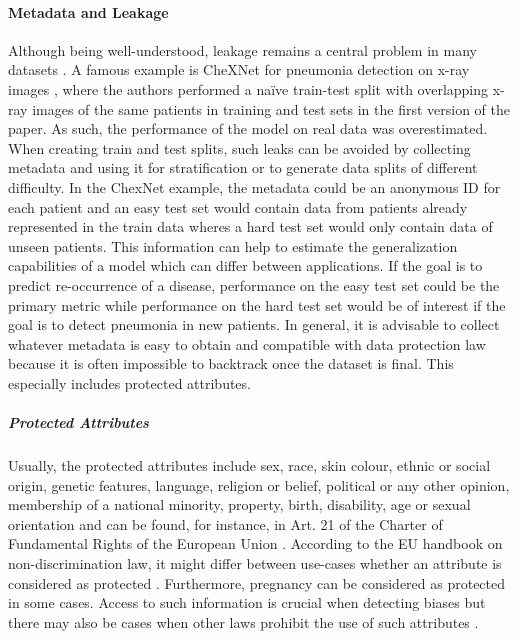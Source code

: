 \paragraph{Metadata and Leakage} Although being well-understood, leakage remains a central problem in many datasets \citep{Kapoor22_LeakageAndReproducibility}. A famous example is CheXNet for pneumonia detection on x-ray images \citep{Rajpurkar2017_CheXNet}, where the authors performed a na\"ive train-test split with overlapping x-ray images of the same patients in training and test sets in the first version of the paper. As such, the performance of the model on real data was overestimated. 
When creating train and test splits, such leaks can be avoided by collecting metadata and using it for stratification or to generate data splits of different difficulty.  In the ChexNet example, the metadata could be an anonymous ID for each patient and an easy test set would contain data from patients already represented in the train data wheres a hard test set would only contain data of unseen patients. This information can help to estimate the generalization capabilities of a model which can differ between applications. If the goal is to predict re-occurrence of a disease, performance on the easy test set could be the primary metric while performance on the hard test set would be of interest if the goal is to detect pneumonia in new patients. In general, it is advisable to collect whatever metadata is easy to obtain and compatible with data protection law because it is often impossible to backtrack once the dataset is final. This especially includes protected attributes.  

\hspace*{10mm}\subparagraph{Protected Attributes}
\label{app:protected_attrs}
Usually, the protected attributes include sex, race, skin colour, ethnic or social origin, 
genetic features, language, religion or belief, political or any other opinion, membership of a national minority, property, birth, disability, age or sexual orientation and can be found, for instance, in Art. 21 of the Charter of Fundamental Rights of the European Union \citep{CharterFundamentalRightsEU}. According to the EU handbook on non-discrimination law, 
it might differ between use-cases whether an attribute is considered as protected \citep{Handbook2018_NonDiscrimination}. Furthermore, pregnancy can be considered as protected in some cases. Access to such information is crucial when detecting biases but there may also be cases when other laws prohibit the use of such attributes \citep{van_Bekkum_2023_DoesGDPRNeedException}. 

